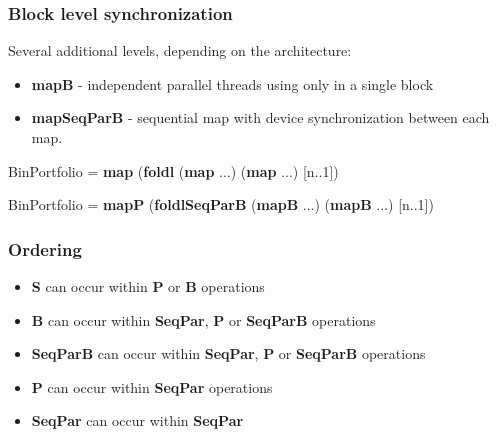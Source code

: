 \documentclass{beamer}
\begin{document}
\begin{frame}
  \frametitle{Block level synchronization}

  Several additional levels, depending on the architecture:

  \begin{itemize}
  \item \textbf{mapB} - independent parallel threads using only in a single block
  \item \textbf{mapSeqParB} - sequential map with device synchronization between each map.
  \end{itemize}




  BinPortfolio = \textbf{map} (\textbf{foldl} (\textbf{map} ...) (\textbf{map} ...) [n..1])

  BinPortfolio = \textbf{mapP} (\textbf{foldlSeqParB} (\textbf{mapB} ...) (\textbf{mapB} ...) [n..1])

\end{frame}

\begin{frame}
  \frametitle{Ordering}
  \begin{itemize}
  \item \textbf{S} can occur within \textbf{P} or \textbf{B} operations
  \item \textbf{B} can occur within \textbf{SeqPar}, \textbf{P} or \textbf{SeqParB} operations
  \item \textbf{SeqParB} can occur within \textbf{SeqPar}, \textbf{P} or \textbf{SeqParB} operations
  \item \textbf{P} can occur within \textbf{SeqPar} operations
  \item \textbf{SeqPar} can occur within \textbf{SeqPar} 
  \end{itemize}
\end{frame}

\end{document}
